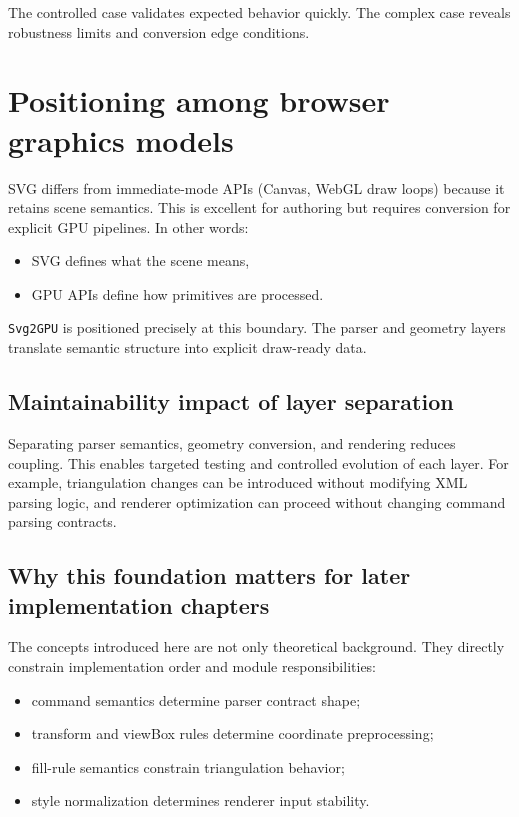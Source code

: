 The controlled case validates expected behavior quickly.
The complex case reveals robustness limits and conversion edge conditions.

\section{Positioning among browser graphics models}

SVG differs from immediate-mode APIs (Canvas, WebGL draw loops) because it retains scene semantics.
This is excellent for authoring but requires conversion for explicit GPU pipelines.
In other words:

\begin{itemize}
\item SVG defines what the scene means,
\item GPU APIs define how primitives are processed.
\end{itemize}

\texttt{Svg2GPU} is positioned precisely at this boundary.
The parser and geometry layers translate semantic structure into explicit draw-ready data.

\subsection{Maintainability impact of layer separation}

Separating parser semantics, geometry conversion, and rendering reduces coupling.
This enables targeted testing and controlled evolution of each layer.
For example, triangulation changes can be introduced without modifying XML parsing logic, and renderer optimization can proceed without changing command parsing contracts.

\subsection{Why this foundation matters for later implementation chapters}

The concepts introduced here are not only theoretical background.
They directly constrain implementation order and module responsibilities:

\begin{itemize}
\item command semantics determine parser contract shape;
\item transform and viewBox rules determine coordinate preprocessing;
\item fill-rule semantics constrain triangulation behavior;
\item style normalization determines renderer input stability.
\end{itemize}


